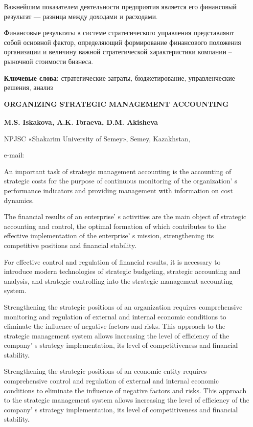 Важнейшим показателем деятельности предприятия является его финансовый
результат --- разница между доходами и расходами.

Финансовые результаты в системе стратегического управления представляют
собой основной фактор, определяющий формирование финансового положения
организации и величину важной стратегической характеристики компании --
рыночной стоимости бизнеса.

{\bfseries Ключевые слова:} стратегические затраты, бюджетирование,
управленческие решения, анализ
\vspace{2em}
\begin{articleheader}
{\bfseries ORGANIZING STRATEGIC MANAGEMENT ACCOUNTING}

{\bfseries
M.S. Iskakova\textsuperscript{\envelope },
A.K. Ibraeva,
D.M. Akisheva
}
\end{articleheader}

\begin{affiliation}
NPJSC «Shakarim University of Semey», Semey, Kazakhstan,

e-mail: \href{mailto:mis0508@mail.ru}{}
\end{affiliation}

An important task of strategic management accounting is the accounting
of strategic costs for the purpose of continuous monitoring of the
organization' s performance indicators and providing
management with information on cost dynamics.

The financial results of an enterprise' s activities are
the main object of strategic accounting and control, the optimal
formation of which contributes to the effective implementation of the
enterprise' s mission, strengthening its competitive
positions and financial stability.

For effective control and regulation of financial results, it is
necessary to introduce modern technologies of strategic budgeting,
strategic accounting and analysis, and strategic controlling into the
strategic manage\-ment accounting system.

Strengthening the strategic positions of an organization requires
comprehensive monitoring and regulation of external and internal
economic conditions to eliminate the influence of negative factors and
risks. This approach to the strategic management system allows
increasing the level of efficiency of the company' s
strategy implementation, its level of competitiveness and financial
stability.

Strengthening the strategic positions of an economic entity requires
comprehensive control and regulation of external and internal economic
conditions to eliminate the influence of negative factors and risks.
This approach to the strategic management system allows increasing the
level of efficiency of the company' s strategy
implementation, its level of competitiveness and financial stability.

